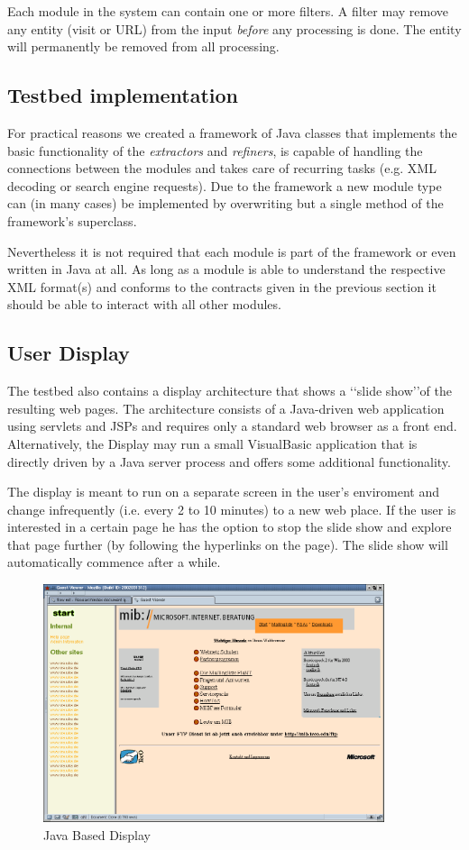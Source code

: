\documentclass[a4paper]{danarticle}
\theoremstyle{remark}
\begin{document}
      Each module in the system can contain one or more filters. A filter may 
      remove any entity (visit or URL) from the input \textit{before} any 
      processing is done. The entity will permanently be removed from all 
      processing.
    \subsection{Testbed implementation}
      For practical reasons we created a framework of Java classes that 
      implements the basic functionality of the \textit{extractors} and 
      \textit{refiners}, is capable of handling the connections between the 
      modules and takes care of recurring tasks (e.g. XML decoding or search 
      engine requests). Due to the framework a new module type can (in many 
      cases) be implemented by overwriting but a single method of the 
      framework's superclass.
      
      Nevertheless it is not required that each module is part of the 
      framework or even written in Java at all. As long as a module is able to 
      understand the respective XML format(s) and conforms to the contracts 
      given in the previous section it should be able to interact with all 
      other modules.
    \subsection{User Display}
      The testbed also contains a display architecture that shows a \lq\lq slide
      show\rq\rq of the resulting web pages. The architecture consists of a
      Java-driven web application using servlets and JSPs and requires only a
      standard web browser as a front end. Alternatively, the Display may run a
      small VisualBasic application that is directly driven by a Java server
      process and offers some additional functionality.
      
      The display is meant to run on a separate screen in the user's enviroment
      and change infrequently (i.e. every 2 to 10 minutes) to a new web place.
      If the user is interested in a certain page he has the option to stop the
      slide show and explore that page further (by following the hyperlinks on
      the page). The slide show will automatically commence after a while.
      \begin{figure}[ht]
       \centering
	 \includegraphics[width=10cm]{javaclient}
	 \caption{Java Based Display}
	 \label{javaclient}
       \end{figure}
      
\end{document}
